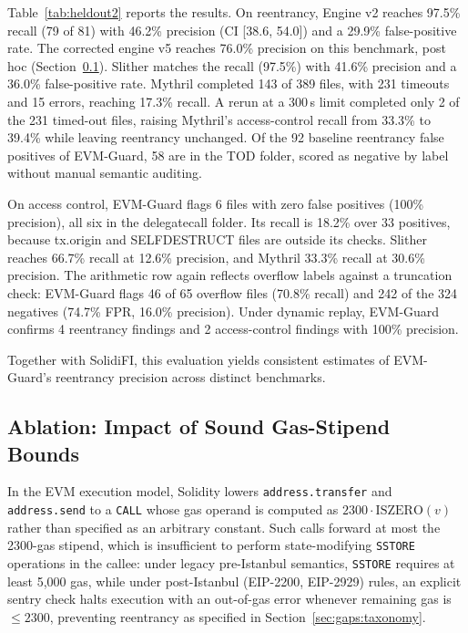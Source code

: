 \documentclass[pdflatex,sn-mathphys]{sn-jnl}
\theoremstyle{thmstyleone}
\theoremstyle{thmstyletwo}
\begin{document}
Table~\ref{tab:heldout2} reports the results. On reentrancy, Engine v2 reaches 97.5\% recall (79 of 81) with 46.2\% precision (CI [38.6, 54.0]) and a 29.9\% false-positive rate. The corrected engine v5 reaches 76.0\% precision on this benchmark, post hoc (Section~\ref{sec:results:correction}). Slither matches the recall (97.5\%) with 41.6\% precision and a 36.0\% false-positive rate. Mythril completed 143 of 389 files, with 231 timeouts and 15 errors, reaching 17.3\% recall. A rerun at a 300\,s limit completed only 2 of the 231 timed-out files, raising Mythril's access-control recall from 33.3\% to 39.4\% while leaving reentrancy unchanged. Of the 92 baseline reentrancy false positives of EVM-Guard, 58 are in the TOD folder, scored as negative by label without manual semantic auditing.

On access control, EVM-Guard flags 6 files with zero false positives (100\% precision), all six in the delegatecall folder. Its recall is 18.2\% over 33 positives, because tx.origin and SELFDESTRUCT files are outside its checks. Slither reaches 66.7\% recall at 12.6\% precision, and Mythril 33.3\% recall at 30.6\% precision. The arithmetic row again reflects overflow labels against a truncation check: EVM-Guard flags 46 of 65 overflow files (70.8\% recall) and 242 of the 324 negatives (74.7\% FPR, 16.0\% precision). Under dynamic replay, EVM-Guard confirms 4 reentrancy findings and 2 access-control findings with 100\% precision.

Together with SolidiFI, this evaluation yields consistent estimates of EVM-Guard's reentrancy precision across distinct benchmarks.

\subsection{Ablation: Impact of Sound Gas-Stipend Bounds}\label{sec:results:correction}
In the EVM execution model, Solidity lowers \texttt{address.transfer} and \texttt{address.send} to a \texttt{CALL} whose gas operand is computed as $2300 \cdot \mathrm{ISZERO}(v)$ rather than specified as an arbitrary constant. Such calls forward at most the 2300-gas stipend, which is insufficient to perform state-modifying \texttt{SSTORE} operations in the callee: under legacy pre-Istanbul semantics, \texttt{SSTORE} requires at least 5,000 gas, while under post-Istanbul (EIP-2200, EIP-2929) rules, an explicit sentry check halts execution with an out-of-gas error whenever remaining gas is $\le 2300$, preventing reentrancy as specified in Section~\ref{sec:gaps:taxonomy}.
\end{document}
